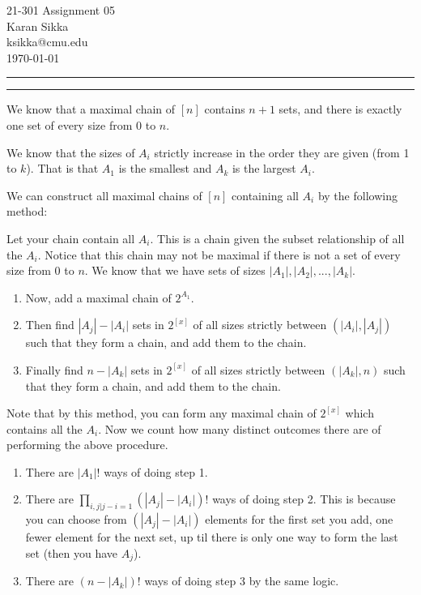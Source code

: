 \documentclass[11pt,letterpaper]{article}
\makeatletter
\newcommand{\question}[1] {\vspace{.25in} \hrule\vspace{0.5em}
\noindent{\bf #1} \vspace{0.5em}
\hrule \vspace{.10in}}
\newcommand{\myname}{Karan Sikka}
\newcommand{\myandrew}{ksikka@cmu.edu}
\newcommand{\myhwnum}{05}
\makeatother
\begin{document}
\medskip

\thispagestyle{plain}
\begin{center}                  %
{\Large 21-301 Assignment \myhwnum} \\
\myname \\
\myandrew \\
\today
\end{center}


\question{1}
We know that a maximal chain of $[n]$ contains $n+1$ sets, and there is exactly one set of every size from 0 to $n$.

We know that the sizes of $A_i$ strictly increase in the order they are given (from 1 to $k$). That is that $A_1$ is the smallest and $A_k$ is the largest $A_i$.

We can construct all maximal chains of $[n]$ containing all $A_i$ by the following method:

Let your chain contain all $A_i$. This is a chain given the subset relationship of all the $A_i$.
Notice that this chain may not be maximal if there is not a set of every size from 0 to $n$.
We know that we have sets of sizes $|A_1|, |A_2|, ..., |A_k|$.
\begin{enumerate}
\item Now, add a maximal chain of $2^{A_1}$.
\item Then find $|A_j| - |A_i|$ sets in $2^{[x]}$ of all sizes strictly between $(|A_i|, |A_j|)$ such that they form a chain, and add them to the chain.
\item Finally find $n - |A_k|$ sets in $2^{[x]}$ of all sizes strictly between $(|A_k|, n)$ such that they form a chain, and add them to the chain.
\end{enumerate}

Note that by this method, you can form any maximal chain of $2^{[x]}$ which contains all the $A_i$.
Now we count how many distinct outcomes there are of performing the above procedure.

\begin{enumerate}
\item There are $|A_1|!$ ways of doing step 1.
\item There are $\prod_{i,j | j-i = 1} (|A_j| - |A_i|)!$ ways of doing step 2. This is because you can choose from $(|A_j| - |A_i|)$ elements for the first set you add, one fewer element for the next set, up til there is only one way to form the last set (then you have $A_j$).
\item There are $(n - |A_k|)!$ ways of doing step 3 by the same logic.
\end{enumerate}
\end{document}
